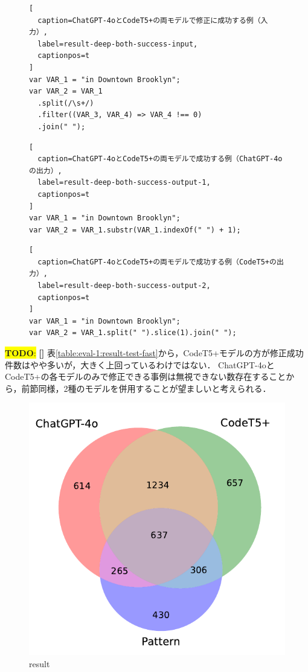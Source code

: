 \documentclass[11pt]{jreport}
\newcommand{\todo}[1]{\colorbox{yellow}{{\bf TODO}:}{\color{red} {\textbf{[#1]}}}}
\begin{document}
\begin{figure}[t]
\captionsetup{name=Listing}
\hspace{0.04\columnwidth}
\begin{minipage}[b]{0.96\linewidth}
\begin{lstlisting}[
  caption=ChatGPT-4oとCodeT5+の両モデルで修正に成功する例（入力）,
  label=result-deep-both-success-input,
  captionpos=t
]
var VAR_1 = "in Downtown Brooklyn";
var VAR_2 = VAR_1
  .split(/\s+/)
  .filter((VAR_3, VAR_4) => VAR_4 !== 0)
  .join(" ");
\end{lstlisting}
\end{minipage}

\hspace{0.04\columnwidth}
\begin{minipage}[b]{0.96\linewidth}
\begin{lstlisting}[
  caption=ChatGPT-4oとCodeT5+の両モデルで成功する例（ChatGPT-4oの出力）,
  label=result-deep-both-success-output-1,
  captionpos=t
]
var VAR_1 = "in Downtown Brooklyn";
var VAR_2 = VAR_1.substr(VAR_1.indexOf(" ") + 1);
\end{lstlisting}
\end{minipage}

\hspace{0.04\columnwidth}
\begin{minipage}[b]{0.96\linewidth}
\begin{lstlisting}[
  caption=ChatGPT-4oとCodeT5+の両モデルで成功する例（CodeT5+の出力）,
  label=result-deep-both-success-output-2,
  captionpos=t
]
var VAR_1 = "in Downtown Brooklyn";
var VAR_2 = VAR_1.split(" ").slice(1).join(" ");
\end{lstlisting}
\end{minipage}
\end{figure}


\todo{}
表\ref{table:eval-1:result-test-fast}から，CodeT5+モデルの方が修正成功件数はやや多いが，大きく上回っているわけではない．
ChatGPT-4oとCodeT5+の各モデルのみで修正できる事例は無視できない数存在することから，前節同様，2種のモデルを併用することが望ましいと考えられる．


\begin{figure}[t]
\begin{center}
\includegraphics[width=0.5\linewidth]{Omori_fig/figure-venn3.pdf}
\caption{result}
\label{fig:eval-1:result-fast-venn3}
\end{center}
\end{figure}
\end{document}
